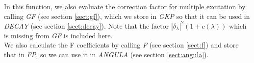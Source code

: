 \noindent In this function, we also evaluate the correction factor for
multiple excitation by calling {\em GF} (see section \ref{sect:gf}), which
we store in {\em GKP} so that it can be used in {\em DECAY} (see section
\ref{sect:decay}). Note that the factor
$|\delta_\lambda|^2 (1 + c(\lambda))$ which is missing from {\em GF} is
included here.\\

\noindent We also calculate the F coefficients by calling {\em F}
(see section \ref{sect:f}) and store that in {\em FP}, so we can use it in
{\em ANGULA} (see section \ref{sect:angula}).\\
